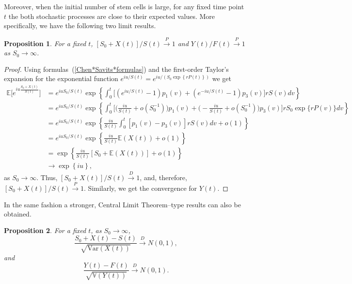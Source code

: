 \documentclass[10pt]{article}
\newtheorem{proposition}{Proposition}
\newcommand{\Var}{\mathbb{V}}
\newcommand{\EE}{\mathbb{E}}
\begin{document}
Moreover, when the initial number of stem cells is large, for any fixed time point $t$ the both stochastic processes are close
to their expected values. More specifically, we have the following two limit results.
\begin{proposition}
For a fixed $t$, $[S_0+X(t)]/S(t)  \overset{P}{\longrightarrow} 1$ and $Y(t)/F(t) \overset{P}{\longrightarrow} 1$ as $S_0 \rightarrow \infty$.
\end{proposition}
\begin{proof}
Using  formulas~(\ref{Chen*Savits*formulas}) and the first-order Taylor's expansion for the exponential function $e^{iu/S(t)}=e^{iu/(S_0 \exp \left\{ r P(t) \right\})}$ we get
\begin{equation*}
\begin{split}
\EE\Big[e^{iu \frac{S_0+X(t)}{S(t)}}\Big] & =e^{iu S_0/S(t)} \exp \left\{  \int_0^t \Big[ \left(e^{i u/S(t)} - 1\right) p_1(v) + \left(e^{-i u/S(t)} - 1\right)p_3(v)\Big] r S(v) dv\right\} \\
& = e^{iu S_0/S(t)}\exp \left\{ \int_0^t \Big[ \Big(\frac{iu}{S(t)}  + o\left(S_0^{-1}\right) \Big) p_1(v) + \Big( - \frac{iu}{S(t)}  + o\left(S_0^{-1}\right) \Big) p_3(v)  \Big] r S_0\exp\{r P(v)\} dv\right\} \\
& = e^{iu S_0/S(t)}\exp \left\{ \frac{iu}{S(t)} \int_0^t  [p_1(v) - p_3(v)] r S(v) dv  + o(1)\right\}\\       %
& = e^{iu S_0/S(t)}\exp \left\{ \frac{iu}{S(t)} \EE(X(t))  +  o (1)\right\}\\                                  %
& = \exp \left\{ \frac{iu}{S(t)} [S_0+\EE(X(t))]  +  o (1)\right\} \\                                                  %
& \rightarrow \exp \left\{iu\right\},
\end{split}
\end{equation*}
as $S_0\to\infty.$
Thus, $[S_0+X(t)]/S(t)  \overset{D}{\longrightarrow} 1$, and, therefore, $[S_0+X(t)]/S(t)  \overset{P}{\longrightarrow} 1$. Similarly, we get the convergence for $Y(t)$.
\end{proof}
In the same fashion a stronger, Central Limit Theorem–type results can also be obtained.
\begin{proposition}
For a fixed $t$, as $S_0 \rightarrow \infty$,
\begin{equation*}
\frac{S_0+X(t) - S(t)}{\sqrt{\text{Var}(X(t))}} \overset{D}{\longrightarrow} N(0, 1),
\end{equation*}
and
\begin{equation*}
\frac{Y(t) - F(t)}{\sqrt{\Var(Y(t))}} \overset{D}{\longrightarrow} N(0, 1).
\end{equation*}
\end{proposition}
\end{document}
